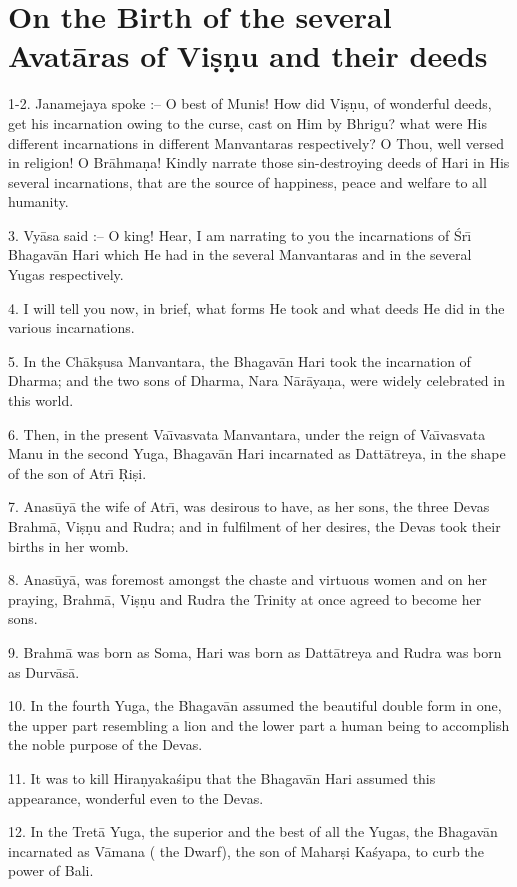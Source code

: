 \chapter{On the Birth of the several Avat\=aras of Vi\d{s}\d{n}u and their deeds}

1-2. Janamejaya spoke :-- O best of Munis! How did Vi\d{s}\d{n}u, of wonderful deeds, get his incarnation owing to the curse, cast on Him by Bhrigu? what were His different incarnations in different Manvantaras respectively? O Thou, well versed in religion! O Br\=ahma\d{n}a! Kindly narrate those sin-destroying deeds of Hari in His several incarnations, that are the source of happiness, peace and welfare to all humanity.

3. Vy\=asa said :-- O king! Hear, I am narrating to you the incarnations of \'Sr\={\i} Bhagav\=an Hari which He had in the several Manvantaras and in the several Yugas respectively.

4. I will tell you now, in brief, what forms He took and what deeds He did in the various incarnations.

5. In the Ch\=ak\d{s}usa Manvantara, the Bhagav\=an Hari took the incarnation of Dharma; and the two sons of Dharma, Nara N\=ar\=aya\d{n}a, were widely celebrated in this world.

6. Then, in the present Va\={\i}vasvata Manvantara, under the reign of Va\={\i}vasvata Manu in the second Yuga, Bhagav\=an Hari incarnated as Datt\=atreya, in the shape of the son of Atr\={\i} \d{R}i\d{s}i.

7. Anas\=uy\=a the wife of Atr\={\i}, was desirous to have, as her sons, the three Devas Brahm\=a, Vi\d{s}\d{n}u and Rudra; and in fulfilment of her desires, the Devas took their births in her womb.

8. Anas\=uy\=a, was foremost amongst the chaste and virtuous women and on her praying, Brahm\=a, Vi\d{s}\d{n}u and Rudra the Trinity at once agreed to become her sons.

9. Brahm\=a was born as Soma, Hari was born as Datt\=atreya and Rudra was born as Durv\=as\=a.

10. In the fourth Yuga, the Bhagav\=an assumed the beautiful double form in one, the upper part resembling a lion and the lower part a human being to accomplish the noble purpose of the Devas.

11. It was to kill Hira\d{n}yaka\'sipu that the Bhagav\=an Hari assumed this appearance, wonderful even to the Devas.

12. In the Tret\=a Yuga, the superior and the best of all the Yugas, the Bhagav\=an incarnated as V\=amana ( the Dwarf), the son of Mahar\d{s}i Ka\'syapa, to curb the power of Bali.

